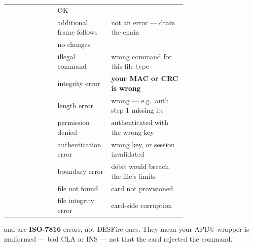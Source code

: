 \begin{center}\small
\begin{tabular}{@{}lL{0.30\linewidth}L{0.42\linewidth}@{}}
\toprule
{} &  &  \\
\midrule
{} & OK & \\
 & additional frame follows & not an error --- drain the chain \\
 & no changes & \\
 & illegal command & wrong command for this file type \\
 & integrity error & \textbf{your MAC or CRC is wrong} \\
 & length error & wrong  --- e.g.\ auth step 1 missing its  \\
 & permission denied & authenticated with the wrong key \\
 & authentication error & wrong key, or session invalidated \\
 & boundary error & debit would breach the file's limits \\
 & file not found & card not provisioned \\
 & file integrity error & card-side corruption \\
\bottomrule
\end{tabular}
\end{center}

 and  are \textbf{ISO-7816} errors, not DESFire ones. They
mean your APDU wrapper is malformed --- bad CLA or INS --- not that the card
rejected the command.
